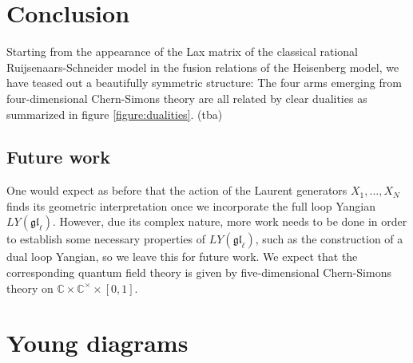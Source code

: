 \documentclass[11pt]{report}
\theoremstyle{definition}
\theoremstyle{remark}
\theoremstyle{remark}
\newcommand{\C}{\mathbb{C}}
\begin{document}
\chapter{Conclusion}\label{chapter:conclusion}

Starting from the appearance of the Lax matrix of the classical rational Ruijsenaars-Schneider model in the fusion relations of the Heisenberg model, we have teased out a beautifully symmetric structure: The four arms emerging from four-dimensional Chern-Simons theory are all related by clear dualities as summarized in figure \ref{figure:dualities}. (tba)

\section*{Future work}

One would expect as before that the action of the Laurent generators $X_1,...,X_N$ finds its geometric interpretation once we incorporate the full loop Yangian $LY(\mathfrak{gl}_\ell)$. However, due its complex nature, more work needs to be done in order to establish some necessary properties of $LY(\mathfrak{gl}_\ell)$, such as the construction of a dual loop Yangian, so we leave this for future work. We expect that the corresponding quantum field theory is given by five-dimensional Chern-Simons theory on $\C \times \C^\times \times [0,1]$.



\appendix \label{appendix}

\chapter{Young diagrams} \label{appendix:youngdiagrams}
\end{document}
